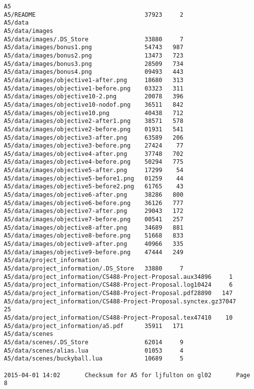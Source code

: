 \documentclass[12pt]{article}
\begin{document}
\begin{verbatim}
A5                                      
A5/README                               37923     2
A5/data                                 
A5/data/images                          
A5/data/images/.DS_Store                33880     7
A5/data/images/bonus1.png               54743   987
A5/data/images/bonus2.png               13473   723
A5/data/images/bonus3.png               28509   734
A5/data/images/bonus4.png               09493   443
A5/data/images/objective1-after.png     18680   313
A5/data/images/objective1-before.png    03323   311
A5/data/images/objective10-2.png        20078   396
A5/data/images/objective10-nodof.png    36511   842
A5/data/images/objective10.png          40438   712
A5/data/images/objective2-after1.png    38571   578
A5/data/images/objective2-before.png    01931   541
A5/data/images/objective3-after.png     63589   206
A5/data/images/objective3-before.png    27424    77
A5/data/images/objective4-after.png     37748   702
A5/data/images/objective4-before.png    50294   775
A5/data/images/objective5-after.png     17299    54
A5/data/images/objective5-before1.png   01259    44
A5/data/images/objective5-before2.png   61765    43
A5/data/images/objective6-after.png     38286   800
A5/data/images/objective6-before.png    36126   777
A5/data/images/objective7-after.png     29043   172
A5/data/images/objective7-before.png    00541   257
A5/data/images/objective8-after.png     34689   881
A5/data/images/objective8-before.png    51668   833
A5/data/images/objective9-after.png     40966   335
A5/data/images/objective9-before.png    47444   249
A5/data/project_information             
A5/data/project_information/.DS_Store   33880     7
A5/data/project_information/CS488-Project-Proposal.aux34896     1
A5/data/project_information/CS488-Project-Proposal.log10424     6
A5/data/project_information/CS488-Project-Proposal.pdf28890   147
A5/data/project_information/CS488-Project-Proposal.synctex.gz37047    25
A5/data/project_information/CS488-Project-Proposal.tex47410    10
A5/data/project_information/a5.pdf      35911   171
A5/data/scenes                          
A5/data/scenes/.DS_Store                62014     9
A5/data/scenes/alias.lua                01053     4
A5/data/scenes/buckyball.lua            10689     5

2015-04-01 14:02       Checksum for A5 for ljfulton on gl02       Page 8


\end{verbatim}
\end{document}
